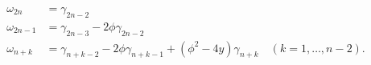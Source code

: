 \begin{equation}
 \begin{split}
  \omega_{2n} &= \gamma_{2n-2} \\
  \omega_{2n-1} &= \gamma_{2n-3} -2\phi \gamma_{2n-2} \\
  \omega_{n+k} &= \gamma_{n+k-2} -2 \phi \gamma_{n+k-1} + (\phi^2-4y) \gamma_{n+k} \quad (k=1,\dots,n-2) .
 \end{split}
\label{squarecoefs}
\end{equation}

